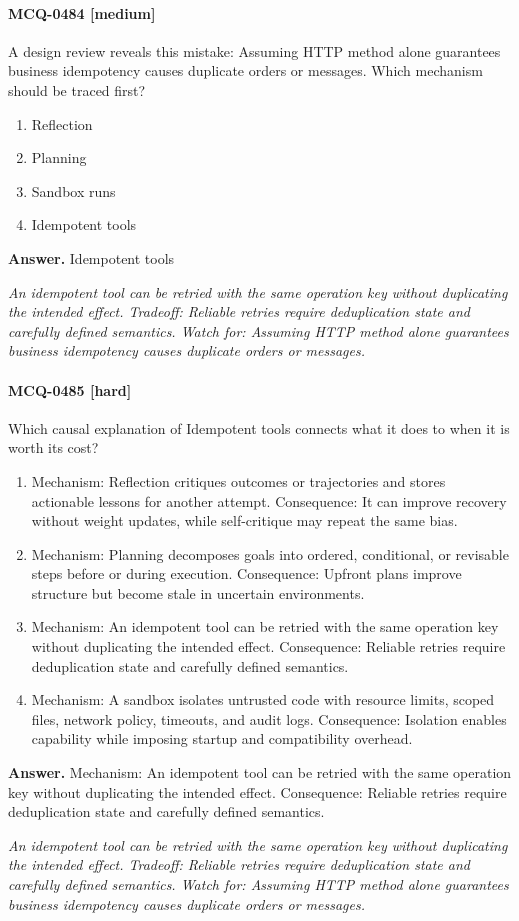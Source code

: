 \paragraph{MCQ-0484 [medium]} A design review reveals this mistake: Assuming HTTP method alone guarantees business idempotency causes duplicate orders or messages. Which mechanism should be traced first?
\begin{enumerate}[label=\Alph*.]
\item Reflection
\item Planning
\item Sandbox runs
\item Idempotent tools
\end{enumerate}
\noindent\textbf{Answer.} Idempotent tools
\par\textit{An idempotent tool can be retried with the same operation key without duplicating the intended effect. Tradeoff: Reliable retries require deduplication state and carefully defined semantics. Watch for: Assuming HTTP method alone guarantees business idempotency causes duplicate orders or messages.}
\paragraph{MCQ-0485 [hard]} Which causal explanation of Idempotent tools connects what it does to when it is worth its cost?
\begin{enumerate}[label=\Alph*.]
\item Mechanism: Reflection critiques outcomes or trajectories and stores actionable lessons for another attempt. Consequence: It can improve recovery without weight updates, while self-critique may repeat the same bias.
\item Mechanism: Planning decomposes goals into ordered, conditional, or revisable steps before or during execution. Consequence: Upfront plans improve structure but become stale in uncertain environments.
\item Mechanism: An idempotent tool can be retried with the same operation key without duplicating the intended effect. Consequence: Reliable retries require deduplication state and carefully defined semantics.
\item Mechanism: A sandbox isolates untrusted code with resource limits, scoped files, network policy, timeouts, and audit logs. Consequence: Isolation enables capability while imposing startup and compatibility overhead.
\end{enumerate}
\noindent\textbf{Answer.} Mechanism: An idempotent tool can be retried with the same operation key without duplicating the intended effect. Consequence: Reliable retries require deduplication state and carefully defined semantics.
\par\textit{An idempotent tool can be retried with the same operation key without duplicating the intended effect. Tradeoff: Reliable retries require deduplication state and carefully defined semantics. Watch for: Assuming HTTP method alone guarantees business idempotency causes duplicate orders or messages.}
